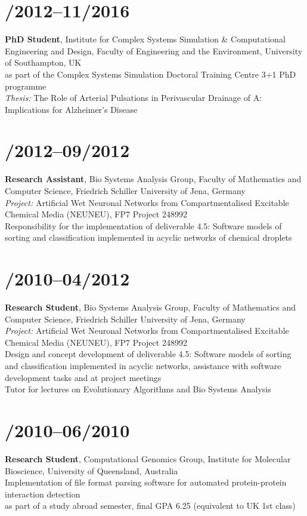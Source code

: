 \documentclass[margin,line,10pt]{res}
\begin{document}
\begin{resume}
\section{/2012--11/2016}{\bf PhD Student}, Institute for Complex Systems Simulation \& Computational Engineering and Design, Faculty of Engineering and the Environment, University of Southampton, UK\\
as part of the Complex Systems Simulation Doctoral Training Centre 3+1 PhD programme\\
{\em Thesis:} The Role of Arterial Pulsations in Perivascular Drainage of A\textbeta: Implications for Alzheimer's Disease\\    
\vspace*{-.35in}        
\section{/2012--09/2012}{\bf Research Assistant}, Bio Systems Analysis Group, Faculty of Mathematics and Computer Science, Friedrich Schiller University of Jena, Germany\\
{\em Project:} Artificial Wet Neuronal Networks from Compartmentalised Excitable Chemical Media (NEUNEU), FP7 Project 248992\\
Responsibility for the implementation of deliverable 4.5: Software models of sorting and classification implemented in acyclic networks of chemical droplets\\
\vspace*{-.35in}
\section{/2010--04/2012}{\bf Research Student}, Bio Systems Analysis Group, Faculty of Mathematics and Computer Science, Friedrich Schiller University of Jena, Germany\\
{\em Project:} Artificial Wet Neuronal Networks from Compartmentalised Excitable Chemical Media (NEUNEU), FP7 Project 248992\\
Design and concept development of deliverable 4.5: Software models of sorting and classification implemented in acyclic networks, assistance with software development tasks and at project meetings\\
Tutor for lectures on Evolutionary Algorithms and Bio Systems Analysis\\
\vspace*{-.35in}
\section{/2010--06/2010}{\bf Research Student}, Computational Genomics Group, Institute for Molecular Bioscience, University of Queensland, Australia\\
Implementation of file format parsing software for automated protein-protein interaction detection\\
as part of a study abroad semester, final GPA 6.25 (equivalent to UK 1st class)\\
\vspace*{-.35in}

\end{resume}
\end{document}

